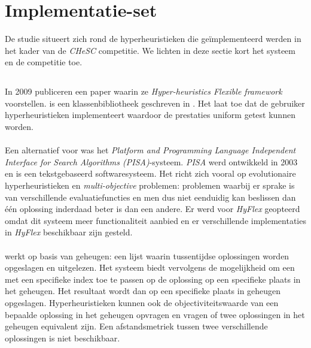 \section{Implementatie-set}

De studie situeert zich rond de hyperheuristieken die ge\"implementeerd werden in het kader van de \emph{CHeSC} competitie. We lichten in deze sectie kort het systeem en de competitie toe.

\subsection{\abhf{}}

In 2009 publiceren  een paper waarin ze \emph{Hyper-heuristics Flexible framework \abhf{}} voorstellen. \abhf{} is een klassenbibliotheek geschreven in \abjava{}. Het laat toe dat de gebruiker hyperheuristieken implementeert waardoor de prestaties uniform getest kunnen worden.

\paragraph{}
Een alternatief voor \abhf{} was het \emph{Platform and Programming Language Independent Interface for Search Algorithms (PISA)}-systeem\cite{Bleuler03pisa-}. \emph{PISA} werd ontwikkeld in 2003 en is een tekstgebaseerd softwaresysteem. Het richt zich vooral op evolutionaire hyperheuristieken en \emph{multi-objective} problemen: problemen waarbij er sprake is van verschillende evaluatiefuncties en men dus niet eenduidig kan beslissen dan \'e\'en oplossing inderdaad beter is dan een andere. Er werd voor \emph{HyFlex} geopteerd omdat dit systeem meer functionaliteit aanbied en er verschillende implementaties in \emph{HyFlex} beschikbaar zijn gesteld.

\paragraph{}
\abhf{} werkt op basis van geheugen: een lijst waarin tussentijdse oplossingen worden opgeslagen en uitgelezen. Het systeem biedt vervolgens de mogelijkheid om een \abllh{} met een specifieke index toe te passen op de oplossing op een specifieke plaats in het geheugen. Het resultaat wordt dan op een specifieke plaats in geheugen opgeslagen. Hyperheuristieken kunnen ook de objectiviteitswaarde van een bepaalde oplossing in het geheugen opvragen en vragen of twee oplossingen in het geheugen equivalent zijn. Een afstandsmetriek tussen twee verschillende oplossingen is niet beschikbaar.

